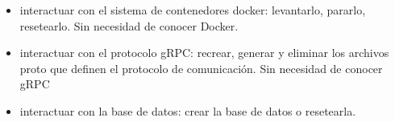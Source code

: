 \begin{itemize}
    \item interactuar con el sistema de contenedores docker: levantarlo, pararlo, resetearlo.
    Sin necesidad de conocer Docker.
    \item interactuar con el protocolo gRPC: recrear, generar y eliminar los archivos proto que definen el protocolo de comunicación.
    Sin necesidad de conocer gRPC
    \item interactuar con la base de datos: crear la base de datos o resetearla.
\end{itemize}
